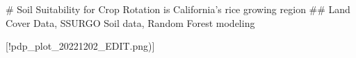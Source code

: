# Soil Suitability for Crop Rotation is California's rice growing region  
## Land Cover Data, SSURGO Soil data, Random Forest modeling  



[!pdp_plot_20221202_EDIT.png)]
